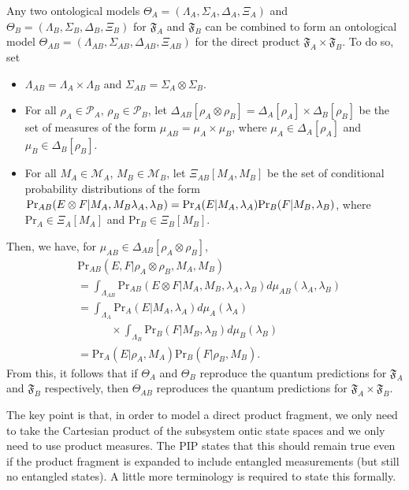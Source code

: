 \documentclass[DIV=calc,fontsize=12pt]{scrartcl} %
\theoremstyle{definition}
\theoremstyle{plain}
\begin{document}
Any two ontological models $\Theta_A = (\Lambda_A, \Sigma_A, \Delta_A,
\Xi_A)$ and $\Theta_B = (\Lambda_B, \Sigma_B, \Delta_B, \Xi_B)$ for
$\mathfrak{F}_A$ and $\mathfrak{F}_B$ can be combined to form an
ontological model \break $\Theta_{AB} = (\Lambda_{AB}, \Sigma_{AB},
\Delta_{AB}, \Xi_{AB})$ for the direct product $\mathfrak{F}_A \times
\mathfrak{F}_B$.  To do so, set
\begin{itemize}
\item $\Lambda_{AB} = \Lambda_A \times \Lambda_B$ and $\Sigma_{AB} =
\Sigma_A \otimes \Sigma_B$.
\item For all $\rho_A \in \mathcal{P}_A$, $\rho_B \in \mathcal{P}_B$,
let $\Delta_{AB}[\rho_A \otimes \rho_B] = \Delta_A[\rho_A] \times
\Delta_B[\rho_B]$ be the set of measures of the form $\mu_{AB} =
\mu_A \times \mu_B$, where $\mu_A \in \Delta_A[\rho_A]$ and $\mu_B
\in \Delta_B[\rho_B]$.
\item  For all $M_A \in \mathcal{M}_A$, $M_B \in \mathcal{M}_B$, let
$\Xi_{AB}[M_A,M_B]$ be the set of conditional probability
distributions of the form
$\text{Pr}_{AB}(E \otimes F|M_A,M_B\lambda_A,\lambda_B) = \break
\text{Pr}_A(E|M_A,\lambda_A)\text{Pr}_B(F|M_B,\lambda_B)$,
where $\text{Pr}_A \in \Xi_A[M_A]$ and $\text{Pr}_B \in
\Xi_B[M_B]$.
\end{itemize}
Then, we have, for $\mu_{AB} \in \Delta_{AB}[\rho_A \otimes \rho_B]$,
\begin{align}
& \text{Pr}_{AB}(E,F|\rho_A \otimes \rho_B,M_A,M_B)\nonumber\\
& = \int_{\Lambda_{AB}} \text{Pr}_{AB}(E \otimes F
|M_A,M_B,\lambda_A,\lambda_B) d\mu_{AB}(\lambda_A,
\lambda_B) \\
& = \int_{\Lambda_A} \text{Pr}_A(E|M_A,\lambda_A) d \mu_{A}
(\lambda_A) \nonumber\\& \quad\quad\quad \times \int_{\Lambda_B} \text{Pr}_B(F|M_B,\lambda_B) d
\mu_{B}(\lambda_B) \\
& = \text{Pr}_A(E|\rho_A,M_A)\text{Pr}_B(F|\rho_B,M_B).
\end{align}
From this, it follows that if $\Theta_A$ and $\Theta_B$ reproduce the
quantum predictions for $\mathfrak{F}_A$ and $\mathfrak{F}_B$
respectively, then $\Theta_{AB}$ reproduces the quantum predictions
for $\mathfrak{F}_A \times \mathfrak{F}_B$.

The key point is that, in order to model a direct product fragment, we
only need to take the Cartesian product of the subsystem ontic state
spaces and we only need to use product measures.  The PIP states that
this should remain true even if the product fragment is expanded to
include entangled measurements (but still no entangled states).  A
little more terminology is required to state this formally.
\end{document}
